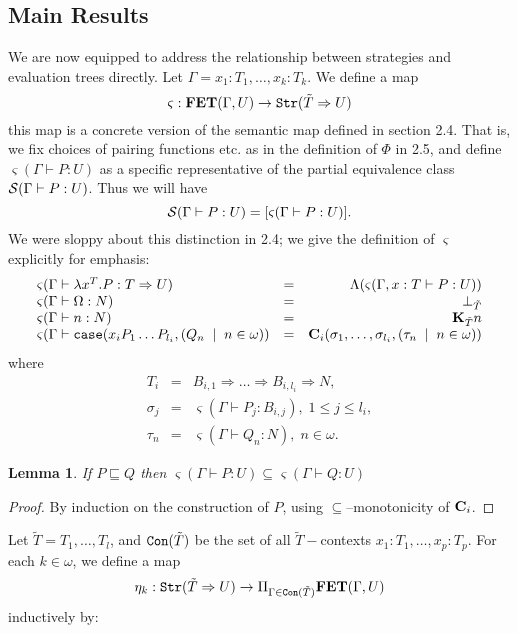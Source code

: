 \documentclass[11pt]{article}
\newtheorem{lemma}[theorem]{Lemma}
\begin{document}
\subsection{Main Results}
We are now equipped to address the relationship between strategies
and evaluation trees directly. Let $\Gamma=x_1:T_1,\dots,x_k:T_k$.
We define a map $$\varsigma:{\bf FET}(\Gamma,U)\rightarrow {\tt
Str}(\tilde{T}\Rightarrow U)$$ this map is a concrete version of
the semantic map defined in section 2.4. That is, we fix choices
of pairing functions etc. as in the definition of $\Phi$ in 2.5,
and define $\varsigma(\Gamma\vdash P:U)$ as a specific
representative of the partial equivalence class ${\cal S}( \Gamma\vdash
P:U)$. Thus we will have $${\cal S}( \Gamma\vdash
P:U)=[\varsigma(\Gamma\vdash P:U)].$$ We were sloppy about this
distinction in 2.4; we give the definition of $\varsigma$
explicitly for emphasis:
\[
\begin{array}{lcr}
\varsigma(\Gamma\vdash \lambda x^T.P:T\Rightarrow U) & = &
\Lambda(\varsigma(\Gamma,x:T\vdash P : U)) \\
\varsigma(\Gamma\vdash \Omega:N) &=& \bot_{\tilde{T}} \\
\varsigma(\Gamma\vdash n:N) &=& {\bf K}_{\tilde{T}}n\\
\varsigma(\Gamma\vdash {\tt case}(x_i P_1\dots P_{l_i},(Q_n\;\mid \;
n\in\omega)) &= &
{\bf C}_i(\sigma_1,\dots,\sigma_{l_i},(\tau_n\;\mid \; n\in\omega))
\end{array} \]
where
\[\begin{array}{lcr}
T_i &=& B_{i,1}\Rightarrow\dots\Rightarrow B_{i,l_i}\Rightarrow N ,\\
\sigma_j &=& \varsigma(\Gamma\vdash P_j:B_{i,j}),\; 1\leq j\leq l_i ,\\
\tau_n &=& \varsigma(\Gamma\vdash Q_n:N) , \; n\in\omega .
\end{array} \]

\begin{lemma}\label{lemmm1}
If $P\sqsubseteq Q$ then $\varsigma(\Gamma\vdash
P:U)\subseteq\varsigma(\Gamma\vdash Q:U)$
\end{lemma}
\begin{proof} By induction on the construction of $P$, using
$\subseteq$--monotonicity  of ${\bf C}_i$.
\end{proof}

Let $\tilde{T}=T_1,\dots,T_l$, and ${\tt Con}(\tilde{T})$ be the set of
all $\tilde{T}-$contexts $x_1:T_1,\dots,x_p:T_p$.
For each $k\in\omega$, we define a map
$$\eta_k: {\tt Str}(\tilde{T}\Rightarrow U) \rightarrow
\Pi_{\Gamma\in{\tt Con}(\tilde{T})} {\bf FET}(\Gamma,U)$$
inductively by:
\end{document}
